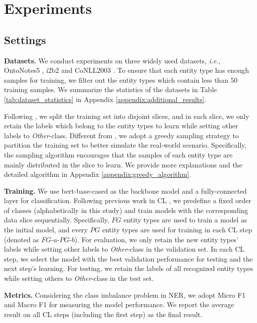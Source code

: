 \documentclass[11pt]{article}
\begin{document}
\section{Experiments}
\subsection{Settings}
\noindent\textbf{Datasets.}\quad 
We conduct experiments on three widely used datasets, \textit{i.e.}, OntoNotes5 \citep{hovy2006ontonotes}, i2b2 \citep{murphy2010serving} and CoNLL2003 \citep{sang2003introduction}.
To ensure that each entity type has enough samples for training, we filter out the entity types which contain less than 50 training samples.
We summarize the statistics of the datasets in Table \ref{tab:dataset_statistics} in Appendix \ref{appendix:additional_results}.

Following \citet{monaikul2021continual}, we split the training set into disjoint slices, and in each slice, we only retain the labels which belong to the entity types to learn while setting other labels to \textit{Other}-class.
Different from \citet{monaikul2021continual}, we adopt a greedy sampling strategy to partition the training set to better simulate the real-world scenario.
Specifically, the sampling algorithm encourages that the samples of each entity type are mainly distributed in the slice to learn.
We provide more explanations and the detailed algorithm in Appendix \ref{appendix:greedy_algorithm}. 

\noindent\textbf{Training.}\quad
We use bert-base-cased \citep{devlin-etal-2019-bert} as the backbone model and a fully-connected layer for classification.
Following previous work in CL \citep{hu2021distilling}, we predefine a fixed order of classes (alphabetically in this study) and train models with the corresponding data slice sequentially.
Specifically, $FG$ entity types are used to train a model as the initial model, and every $PG$ entity types are used for training in each CL step (denoted as $FG$-$a$-$PG$-$b$).
For evaluation, we only retain the new entity types' labels while setting other labels to \textit{Other}-class in the validation set. 
In each CL step, we select the model with the best validation performance for testing and the next step's learning. 
For testing, we retain the labels of all recognized entity types while setting others to \textit{Other}-class in the test set.

\noindent\textbf{Metrics.}\quad
Considering the class imbalance problem in NER, we adopt Micro F1 and Macro F1 for measuring the model performance.
We report the average result on all CL steps (including the first step) as the final result.
\end{document}
